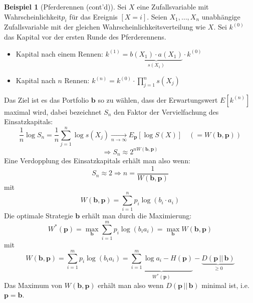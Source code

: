 \documentclass[a4paper]{scrartcl}
\theoremstyle{plain}
\theoremstyle{definition}
\theoremstyle{examplestyle}
\newtheorem{example}{Beispiel}[section]
\newcommand\WK{Wahrscheinlichkeit\xspace}
\newcommand\WV{Wahrscheinlichkeitsverteilung\xspace}
\newcommand\ZV{Zufallsvariable\xspace}
\begin{document}
\begin{example}[Pferderennen (cont'd)]
  Sei $X$ eine \ZV mit \WK $p_i$ f\"ur das Ereignis $\left[ X = i \right]$.
  Seien $X_1,\dots,X_n$ unabh\"angige \ZV mit der gleichen \WV wie $X$. Sei $k^{\left( 0 \right)}$ das Kapital vor der ersten Runde des Pferderennens.
  \begin{itemize}
	\item Kapital nach einem Rennen: $k^{\left( 1 \right)} = \underbrace{b\left( X_1 \right) \cdot a\left( X_1 \right)}_{s\left( X_1 \right)}\cdot{k^{\left( 0 \right)}}$
	\item Kapital nach $n$ Rennen: $k^{\left( n \right)} = k^{\left( 0 \right)} \cdot \displaystyle{\prod_{j=1}^n} s\left( X_j \right) $
  \end{itemize}
  Das Ziel ist es das Portfolio $\mathbf b$ so zu w\"ahlen, dass der Erwartungswert $E\left[ k^{\left( n \right)} \right]$ maximal wird, dabei bezeichnet $S_n$ den Faktor der
  Vervielfachung des Einsatzkapitals:
  \[ \frac{1}{n} \log S_n = \frac{1}{n}\sum_{j=1}^n\log s\left( X_j \right) \underset{n \rightarrow \infty}\rightarrow
		E_\mathbf{p}\left[ \log S\left( X \right) \right] \quad \left( = W\left( \mathbf b, \mathbf p \right) \right)\]
	\[ \Rightarrow S_n \approx 2^{n W\left( \mathbf b, \mathbf p \right)} \]
	Eine Verdopplung des Einsatzkapitals erh\"alt man also wenn:
	\[ S_n \approx 2 \Rightarrow n = \frac{1}{W\left( \mathbf b, \mathbf p \right)} \]
	mit
	\[ W\left( \mathbf b, \mathbf p \right) = \sum_{i=1}^n p_i\log\left( b_i\cdot a_i \right) \]
	Die optimale Strategie $\mathbf b$ erh\"alt man durch die Maximierung:
	\[ W^\ast \left( \mathbf p \right) = \max_{\mathbf b} \sum_{i=1}^m p_i \log \left( b_i a_i \right) = \max_{\mathbf b} W\left( \mathbf b, \mathbf p \right) \]
	mit
	\[ W\left( \mathbf b, \mathbf p \right) = \sum_{i=1}^m p_i \log\left( b_ia_i \right) = \underbrace{\sum_{i=1}^m\log a_i - H\left( \mathbf p \right)}_{W^\ast\left( \mathbf p \right)}
	- \underbrace{D\left( \mathbf p\, ||\, \mathbf b \right)}_{\geq 0} \]
	Das Maximum von $W\left( \mathbf b,\mathbf p \right)$ erhält man also wenn $D\left( \mathbf p\, ||\, \mathbf b \right)$ minimal ist, i.e.\@ $\mathbf p = \mathbf b$.
\end{example}

\pagebreak
\end{document}
